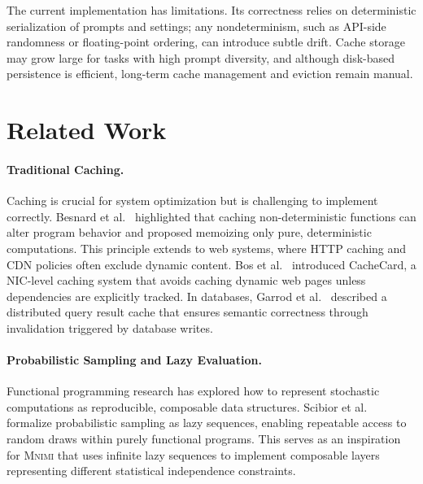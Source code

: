 \documentclass[sigconf]{acmart}
\newcommand{\projName}{\textsc{Mnimi}\xspace}
\begin{document}
The current implementation has limitations. Its correctness relies on deterministic serialization of prompts and settings; any nondeterminism, such as API-side randomness or floating-point ordering, can introduce subtle drift. Cache storage may grow large for tasks with high prompt diversity, and although disk-based persistence is efficient, long-term cache management and eviction remain manual.


\section{Related Work}

\paragraph{\textbf{Traditional Caching.}} Caching is crucial for system optimization but is challenging to implement correctly. Besnard et al.~\cite{besnard2019memoization} highlighted that caching non-deterministic functions can alter program behavior and proposed memoizing only pure, deterministic computations. This principle extends to web systems, where HTTP caching and CDN policies often exclude dynamic content. Bos et al.~\cite{bos2009cachecard} introduced CacheCard, a NIC-level caching system that avoids caching dynamic web pages unless dependencies are explicitly tracked. In databases, Garrod et al.~\cite{garrod2008ferdinand} described a distributed query result cache that ensures semantic correctness through invalidation triggered by database writes.

\paragraph{\textbf{Probabilistic Sampling and Lazy Evaluation.}} Functional programming research has explored how to represent stochastic computations as reproducible, composable data structures. Scibior et al.~\cite{scibior2015practical} formalize probabilistic sampling as lazy sequences, enabling repeatable access to random draws within purely functional programs.  
This serves as an inspiration for \projName that uses infinite lazy sequences to implement composable layers representing different statistical independence constraints.
\end{document}
